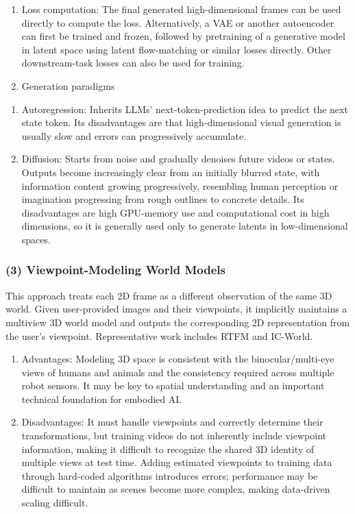 \begin{enumerate}
\def\labelenumi{\arabic{enumi}.}
\item
  Loss computation: The final generated high-dimensional frames can be used directly to compute the loss. Alternatively, a VAE or another autoencoder can first be trained and frozen, followed by pretraining of a generative model in latent space using latent flow-matching or similar losses directly. Other downstream-task losses can also be used for training.
\item
  Generation paradigms
\end{enumerate}

\begin{enumerate}
\def\labelenumi{(\arabic{enumi})}
\item
  Autoregression: Inherits LLMs' next-token-prediction idea to predict the next state token. Its disadvantages are that high-dimensional visual generation is usually slow and errors can progressively accumulate.
\item
  Diffusion: Starts from noise and gradually denoises future videos or states. Outputs become increasingly clear from an initially blurred state, with information content growing progressively, resembling human perception or imagination progressing from rough outlines to concrete details. Its disadvantages are high GPU-memory use and computational cost in high dimensions, so it is generally used only to generate latents in low-dimensional spaces.
\end{enumerate}

\hypertarget{viewpoint-modeling-world-models}{%
\subsubsection{(3) Viewpoint-Modeling World Models}\label{viewpoint-modeling-world-models}}

This approach treats each 2D frame as a different observation of the same 3D world. Given user-provided images and their viewpoints, it implicitly maintains a multiview 3D world model and outputs the corresponding 2D representation from the user's viewpoint. Representative work includes RTFM and IC-World.

\begin{enumerate}
\def\labelenumi{\arabic{enumi}.}
\item
  Advantages: Modeling 3D space is consistent with the binocular/multi-eye views of humans and animals and the consistency required across multiple robot sensors. It may be key to spatial understanding and an important technical foundation for embodied AI.
\item
  Disadvantages: It must handle viewpoints and correctly determine their transformations, but training videos do not inherently include viewpoint information, making it difficult to recognize the shared 3D identity of multiple views at test time. Adding estimated viewpoints to training data through hard-coded algorithms introduces errors; performance may be difficult to maintain as scenes become more complex, making data-driven scaling difficult.
\end{enumerate}

